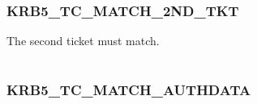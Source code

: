 \documentclass[letterpaper,10pt,english]{sphinxmanual}
\begin{document}
\begin{fulllineitems}
\label{appdev/refs/macros/KRB5_SAM_USE_SAD_AS_KEY:KRB5_SAM_USE_SAD_AS_KEY}
\end{fulllineitems}


\begin{tabulary}{\linewidth}{|L|L|}
\hline

 & 
\\
\hline\end{tabulary}



\subsubsection{KRB5\_TC\_MATCH\_2ND\_TKT}
\label{appdev/refs/macros/KRB5_TC_MATCH_2ND_TKT:krb5-tc-match-2nd-tkt-data}\label{appdev/refs/macros/KRB5_TC_MATCH_2ND_TKT::doc}\label{appdev/refs/macros/KRB5_TC_MATCH_2ND_TKT:krb5-tc-match-2nd-tkt}

\begin{fulllineitems}
\label{appdev/refs/macros/KRB5_TC_MATCH_2ND_TKT:KRB5_TC_MATCH_2ND_TKT}
\end{fulllineitems}


The second ticket must match.

\begin{tabulary}{\linewidth}{|L|L|}
\hline

 & 
\\
\hline\end{tabulary}



\subsubsection{KRB5\_TC\_MATCH\_AUTHDATA}
\label{appdev/refs/macros/KRB5_TC_MATCH_AUTHDATA::doc}\label{appdev/refs/macros/KRB5_TC_MATCH_AUTHDATA:krb5-tc-match-authdata-data}\label{appdev/refs/macros/KRB5_TC_MATCH_AUTHDATA:krb5-tc-match-authdata}

\begin{fulllineitems}
\label{appdev/refs/macros/KRB5_TC_MATCH_AUTHDATA:KRB5_TC_MATCH_AUTHDATA}
\end{fulllineitems}
\end{document}
